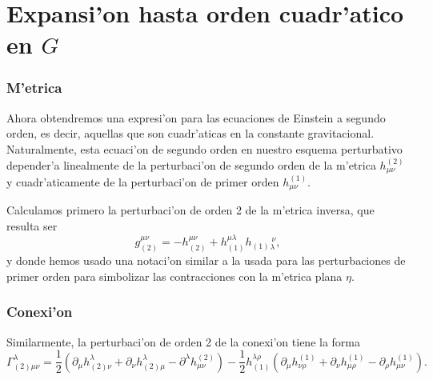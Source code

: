  \section{Expansi'on hasta orden cuadr'atico en \texorpdfstring{$G$}{G}}
\subsubsection{M'etrica}

Ahora obtendremos una expresi'on para las ecuaciones de Einstein a segundo orden, es decir, aquellas que son cuadr'aticas en la constante gravitacional. Naturalmente, esta ecuaci'on de segundo orden en nuestro esquema perturbativo depender'a linealmente de la perturbaci'on de segundo orden de la m'etrica $h^{(2)}_{\mu\nu}$ y cuadr'aticamente de la perturbaci'on de primer orden $h^{(1)}_{\mu\nu}$.

Calculamos primero la perturbaci'on de orden 2 de la m'etrica inversa, que resulta ser 
\begin{equation}
g^{\mu\nu}_{(2)}=-h^{\mu\nu}_{(2)}+ h^{\mu\lambda}_{(1)}h_{(1)}{}_\lambda^{\ \nu} ,
\end{equation}
y donde hemos usado una notaci'on similar a la usada para las perturbaciones de primer orden para simbolizar las contracciones con la m'etrica plana $\eta$.

\subsubsection{Conexi'on}
Similarmente, la perturbaci'on de orden 2 de la conexi'on tiene la forma
\begin{equation}
\Gamma^\lambda_{(2)\mu\nu}=\frac{1}{2}\left(\partial_\mu h^\lambda_{(2)\nu} + \partial_\nu h^\lambda_{(2)\mu} -\partial^\lambda h^{(2)}_{\mu\nu}\right)
-\frac{1}{2}h_{(1)}^{\lambda\rho}\left(\partial_\mu
h^{(1)}_{\nu\rho} +\partial_\nu h^{(1)}_{\mu\rho} - \partial_\rho h^{(1)}_{\mu\nu}\right).
\end{equation}

